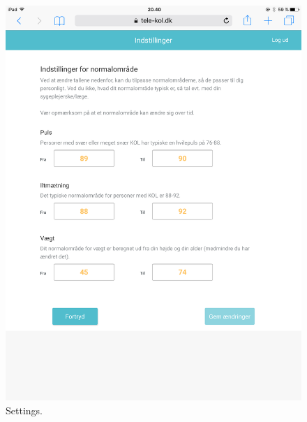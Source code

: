 \begin{figure}[h]
  \centering
  \begin{minipage}[b]{0.45\textwidth}
    \includegraphics[width=\textwidth]{images/implementation/settingsImp.png}
    \caption{Settings.}
    \label{fig:settings}
  \end{minipage}
  \hfill
  \begin{minipage}[b]{0.45\textwidth}

\end{minipage}
\end{figure}
